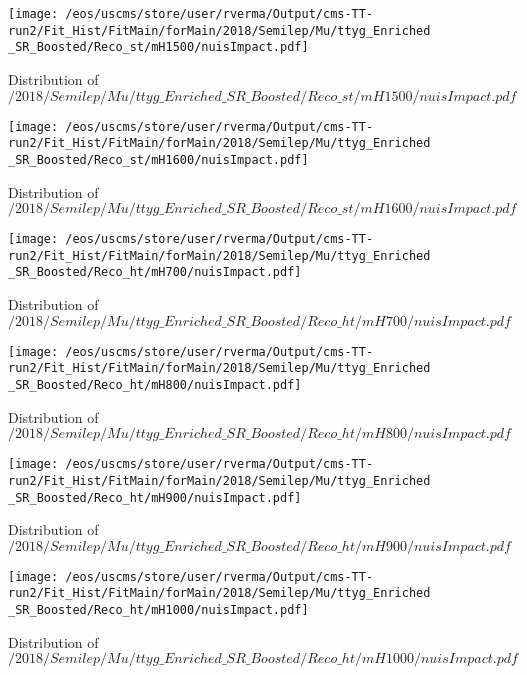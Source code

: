 \begin{figure}
\centering
\texttt{[image: /eos/uscms/store/user/rverma/Output/cms-TT-run2/Fit\_Hist/FitMain/forMain/2018/Semilep/Mu/ttyg\_Enriched\_SR\_Boosted/Reco\_st/mH1500/nuisImpact.pdf]}
\caption{Distribution of $/2018/Semilep/Mu/ttyg\_Enriched\_SR\_Boosted/Reco\_st/mH1500/nuisImpact.pdf$}
\end{figure}

\begin{figure}
\centering
\texttt{[image: /eos/uscms/store/user/rverma/Output/cms-TT-run2/Fit\_Hist/FitMain/forMain/2018/Semilep/Mu/ttyg\_Enriched\_SR\_Boosted/Reco\_st/mH1600/nuisImpact.pdf]}
\caption{Distribution of $/2018/Semilep/Mu/ttyg\_Enriched\_SR\_Boosted/Reco\_st/mH1600/nuisImpact.pdf$}
\end{figure}

\begin{figure}
\centering
\texttt{[image: /eos/uscms/store/user/rverma/Output/cms-TT-run2/Fit\_Hist/FitMain/forMain/2018/Semilep/Mu/ttyg\_Enriched\_SR\_Boosted/Reco\_ht/mH700/nuisImpact.pdf]}
\caption{Distribution of $/2018/Semilep/Mu/ttyg\_Enriched\_SR\_Boosted/Reco\_ht/mH700/nuisImpact.pdf$}
\end{figure}

\begin{figure}
\centering
\texttt{[image: /eos/uscms/store/user/rverma/Output/cms-TT-run2/Fit\_Hist/FitMain/forMain/2018/Semilep/Mu/ttyg\_Enriched\_SR\_Boosted/Reco\_ht/mH800/nuisImpact.pdf]}
\caption{Distribution of $/2018/Semilep/Mu/ttyg\_Enriched\_SR\_Boosted/Reco\_ht/mH800/nuisImpact.pdf$}
\end{figure}

\begin{figure}
\centering
\texttt{[image: /eos/uscms/store/user/rverma/Output/cms-TT-run2/Fit\_Hist/FitMain/forMain/2018/Semilep/Mu/ttyg\_Enriched\_SR\_Boosted/Reco\_ht/mH900/nuisImpact.pdf]}
\caption{Distribution of $/2018/Semilep/Mu/ttyg\_Enriched\_SR\_Boosted/Reco\_ht/mH900/nuisImpact.pdf$}
\end{figure}

\begin{figure}
\centering
\texttt{[image: /eos/uscms/store/user/rverma/Output/cms-TT-run2/Fit\_Hist/FitMain/forMain/2018/Semilep/Mu/ttyg\_Enriched\_SR\_Boosted/Reco\_ht/mH1000/nuisImpact.pdf]}
\caption{Distribution of $/2018/Semilep/Mu/ttyg\_Enriched\_SR\_Boosted/Reco\_ht/mH1000/nuisImpact.pdf$}
\end{figure}

